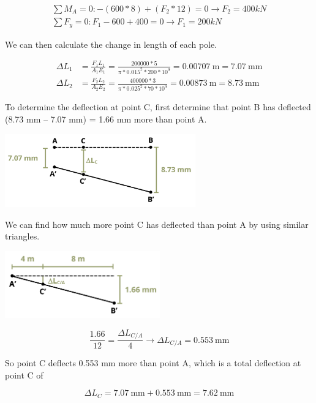 \documentclass[
  letterpaper,
  DIV=11,
  numbers=noendperiod]{scrreprt}
\begin{document}
\begin{tcolorbox}
\begin{tcolorbox}
\[
\begin{gathered}
\sum M_A=0:-(600 * 8)+\left(F_2 * 12\right)=0 \rightarrow F_2=400 k N \\
\sum F_y=0: F_1-600+400=0 \rightarrow F_1=200 k N
\end{gathered}
\]

We can then calculate the change in length of each pole.

\[
\begin{aligned}
\Delta L_1 & =\frac{F_1 L_1}{A_1 E_1}=\frac{200000 * 5}{\pi * 0.015^2 * 200 * 10^9}=0.00707 \mathrm{~m}=7.07 \mathrm{~mm} \\
\Delta L_2 & =\frac{F_2 L_2}{A_2 E_2}=\frac{400000 * 3}{\pi * 0.025^2 * 70 * 10^9}=0.00873 \mathrm{~m}=8.73 \mathrm{~mm}
\end{aligned}
\]

To determine the deflection at point C, first determine that point B has
deflected (8.73 mm -- 7.07 mm) = 1.66 mm more than point A.

\begin{center}
\includegraphics[width=3.23958in,height=\textheight]{images/PNGs/Example 5.4 part 3.png}
\end{center}

We can find how much more point C has deflected than point A by using
similar triangles.

\begin{center}
\includegraphics[width=2.63542in,height=\textheight]{images/PNGs/Example 5.4 part 4.png}
\end{center}

\[
\frac{1.66}{12}=\frac{\Delta L_{C / A}}{4} \rightarrow \Delta L_{C / A}=0.553 \mathrm{~mm}
\]

So point C deflects 0.553 mm more than point A, which is a total
deflection at point C of

\[
\Delta L_C=7.07 \mathrm{~mm}+0.553 \mathrm{~mm}=7.62 \mathrm{~mm}
\]

\end{tcolorbox}

\end{tcolorbox}
\end{document}
